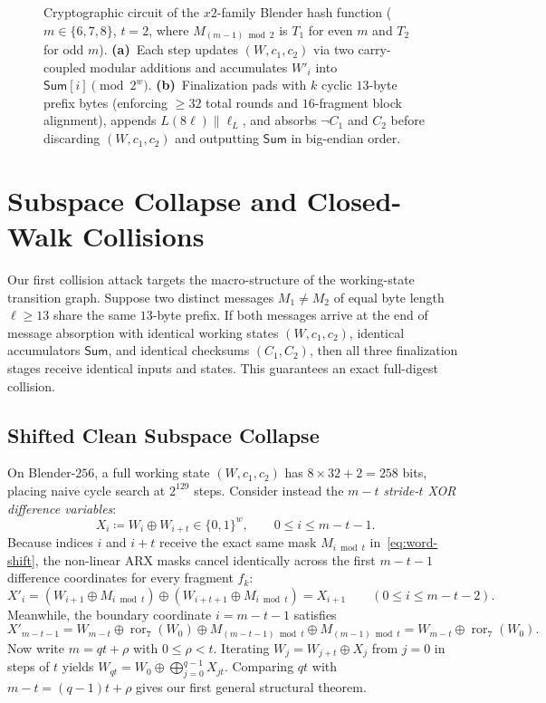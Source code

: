 \documentclass[11pt,a4paper]{article}
\theoremstyle{definition}
\theoremstyle{remark}
\newcommand{\ror}{\operatorname{ror}}
\newcommand{\SumAcc}{\mathsf{Sum}}
\begin{document}
\begin{figure}[t!]
\begin{tikzpicture}
\end{tikzpicture}
\caption{Cryptographic circuit of the $x2$-family Blender hash function ($m \in \{6,7,8\}$, $t = 2$, where $M_{(m-1)\bmod 2}$ is $T_1$ for even $m$ and $T_2$ for odd $m$). \textbf{(a)}~Each step updates $(W, c_1, c_2)$ via two carry-coupled modular additions and accumulates $W'_i$ into $\SumAcc[i] \pmod{2^w}$. \textbf{(b)}~Finalization pads with $k$ cyclic $13$-byte prefix bytes (enforcing $\ge 32$ total rounds and $16$-fragment block alignment), appends $L(8\ell) \| \ell_L$, and absorbs $\neg C_1$ and $C_2$ before discarding $(W, c_1, c_2)$ and outputting $\SumAcc$ in big-endian order.}
\label{fig:blender-arch}
\end{figure}

\section{Subspace Collapse and Closed-Walk Collisions}
\label{sec:route1}

Our first collision attack targets the macro-structure of the working-state transition graph. Suppose two distinct messages $M_1 \neq M_2$ of equal byte length $\ell \ge 13$ share the same $13$-byte prefix. If both messages arrive at the end of message absorption with identical working states $(W, c_1, c_2)$, identical accumulators $\SumAcc$, and identical checksums $(C_1, C_2)$, then all three finalization stages receive identical inputs and states. This guarantees an exact full-digest collision.

\subsection{Shifted Clean Subspace Collapse}
\label{subsec:clean-subspace}
On Blender-$256$, a full working state $(W, c_1, c_2)$ has $8 \times 32 + 2 = 258$ bits, placing naive cycle search at $2^{129}$ steps. Consider instead the $m - t$ \emph{stride-$t$ XOR difference variables}:
\[
    X_i \coloneqq W_i \oplus W_{i+t} \in \{0,1\}^w, \qquad 0 \le i \le m - t - 1.
\]
Because indices $i$ and $i + t$ receive the exact same mask $M_{i \bmod t}$ in~\eqref{eq:word-shift}, the non-linear ARX masks cancel identically across the first $m - t - 1$ difference coordinates for every fragment $f_k$:
\begin{equation}
    X'_i = (W_{i+1} \oplus M_{i \bmod t}) \oplus (W_{i+t+1} \oplus M_{i \bmod t}) = X_{i+1} \qquad (0 \le i \le m - t - 2).
    \label{eq:chain-shift}
\end{equation}
Meanwhile, the boundary coordinate $i = m - t - 1$ satisfies
\begin{equation}
    X'_{m-t-1} = W_{m-t} \oplus \ror_7(W_0) \oplus M_{(m-t-1) \bmod t} \oplus M_{(m-1) \bmod t}
                = W_{m-t} \oplus \ror_7(W_0).
    \label{eq:chain-boundary}
\end{equation}
Now write $m = q t + \rho$ with $0 \le \rho < t$. Iterating $W_j = W_{j+t} \oplus X_j$ from $j = 0$ in steps of $t$ yields $W_{qt} = W_0 \oplus \bigoplus_{j=0}^{q-1} X_{jt}$. Comparing $qt$ with $m - t = (q - 1)t + \rho$ gives our first general structural theorem.
\end{document}
